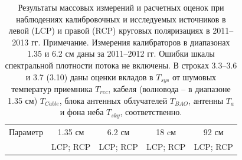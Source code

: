 \begin{table}[tbh]
\caption{Результаты массовых измерений и расчетных оценок при наблюдениях калибровочных и
исследуемых источников в левой (LCP) и правой (RCP) круговых поляризациях в 2011--2013 гг.
\tiny{Примечание. Измерения калибраторов в диапазонах 1.35 и 6.2 см даны за 2011–2012 гг. Ошибки
шкалы спектральной плотности потока не включены. В строках 3.3–3.6 и 3.7 (3.10) даны оценки вкладов
в $T_{sys}$ от шумовых температур приемника $T_{rec}$, кабеля (волновода – в диапазоне 1.35 см)
$T_{Cable}$, блока антенных облучателей $T_{BAO}$, антенны $T_a$ и фона неба $T_{sky}$,
соответственно.
}}
\bigskip
\label{tab:srt_params2}
\centering
    \begin{SingleSpace}
    \tiny
        \begin{tabular}{lcccc}
        \toprule
Параметр              & 1.35 см  & 6.2 см   & 18 cм    & 92 см\\
                      & LCP; RCP & LCP; RCP & LCP; RCP & LCP; RCP\\


\end{tabular}
\end{SingleSpace}
\end{table}
